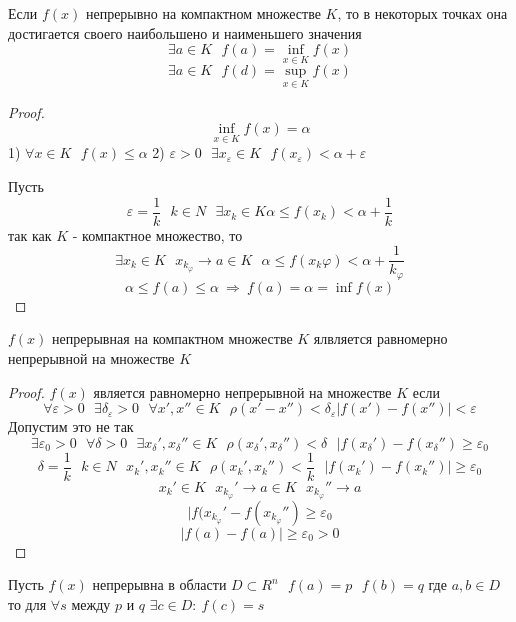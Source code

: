 \begin{theorem}
  Если $f(x)$ непрерывно на компактном множестве $K$, то в некоторых точках она
  достигается своего наибольшено и наименьшего значения
  $$
  \exists a \in K ~~~ f(a) = \inf \limits_{x \in K} f(x)
  $$
  $$
  \exists a \in K ~~~ f(d) = \sup \limits_{x \in K} f(x)
  $$
\end{theorem}

\begin{proof}
  $$
  \inf \limits_{x \in K} f(x) = \alpha
  $$
  1) $\forall x \in K ~~~ f(x) \le \alpha$
  2) $\varepsilon > 0 ~~~ \exists x_{\varepsilon} \in K ~~~
  f(x_{\varepsilon}) < \alpha + \varepsilon$

  Пусть
  $$
  \varepsilon = \frac{1}{k} ~~~ k \in N ~~~ \exists x_k \in K
  \alpha \le f(x_k) < \alpha + \frac{1}{k}
  $$
  так как $K$ - компактное множество, то
  $$
  \exists x_k \in K ~~~ x_{k_{\varphi}} \to a \in K ~~~ \alpha \le
  f(x_k{\varphi}) < \alpha + \frac{1}{k_{\varphi}}
  $$
  $$
  \alpha \le f(a) \le \alpha ~ \Rightarrow ~ f(a) = \alpha = \inf f(x)
  $$
\end{proof}

\begin{theorem}
  $f(x)$ непрерывная на компактном множестве $K$ ялвляется равномерно
  непрерывной на множестве $K$
\end{theorem}

\begin{proof}
  $f(x)$ является равномерно непрерывной на множестве $K$ если
  $$
  \forall \varepsilon > 0 ~~~ \exists \delta_{\varepsilon} > 0 ~~~
  \forall x', x'' \in K ~~~ \rho(x' - x'') < \delta_{\varepsilon}
  |f(x') - f(x'')| < \varepsilon
  $$
  Допустим это не так
  $$
  \exists \varepsilon_0 > 0 ~~~ \forall \delta > 0 ~~~ \exists x_{\delta}',
  x_{\delta}'' \in K ~~~ \rho(x_{\delta}', x_{\delta}'') < \delta ~~~
  |f(x_{\delta}') - f(x_{\delta}'') \ge \varepsilon_0
  $$
  $$
  \delta = \frac{1}{k} ~~~ k \in N ~~~ x_k', x_k'' \in K ~~~
  \rho(x_k', x_k'') < \frac{1}{k} ~~~ |f(x_k') - f(x_k'')| \ge \varepsilon_0
  $$
  $$
  x_k' \in K ~~~ x_{k_{\varphi}}' \to a \in K ~~~ x_{k_{\varphi}}'' \to a
  $$
  $$
  |f(x_{k_{\varphi}}' - f(x_{k_{\varphi}}'') \ge \varepsilon_0
  $$
  $$
  |f(a) - f(a)| \ge \varepsilon_0 > 0
  $$
\end{proof}

\begin{theorem}
  Пусть $f(x)$ непрерывна в области $D \subset R^n ~~~ f(a) = p ~~~ f(b) = q$
  где $a,b \in D$ то для $\forall s$ между $p$ и $q$
  $\exists c \in D: ~ f(c) = s$
\end{theorem}

